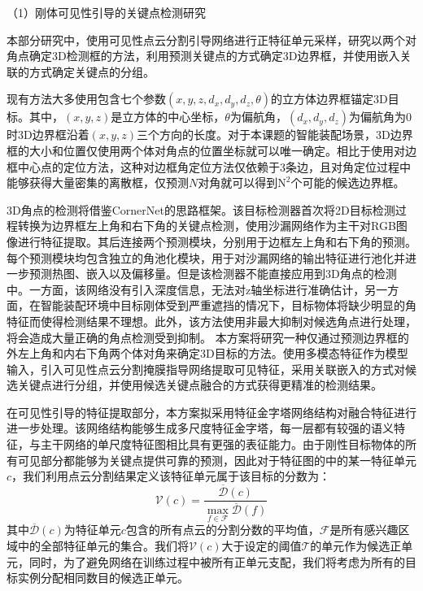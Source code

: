 \documentclass[12pt]{article}
\begin{document}
（1）刚体可见性引导的关键点检测研究

本部分研究中，使用可见性点云分割引导网络进行正特征单元采样，研究以两个对角点确定3D检测框的方法，利用预测关键点的方式确定3D边界框，并使用嵌入关联的方式确定关键点的分组。

现有方法大多使用包含七个参数$(x, y, z, d_x, d_y, d_z, \theta)$的立方体边界框锚定3D目标。其中，$(x,y,z)$是立方体的中心坐标，$\theta$为偏航角，$(d_x, d_y, d_z)$为偏航角为0时3D边界框沿着$(x,y,z)$三个方向的长度。对于本课题的智能装配场景，3D边界框的大小和位置仅使用两个体对角点的位置坐标就可以唯一确定。相比于使用对边框中心点的定位方法，这种对边框角定位方法仅依赖于3条边，且对角定位过程中能够获得大量密集的离散框，仅预测$N$对角就可以得到$\mathrm{N}^2$个可能的候选边界框。


3D角点的检测将借鉴CornerNet的思路框架。该目标检测器首次将2D目标检测过程转换为边界框左上角和右下角的关键点检测，使用沙漏网络作为主干对RGB图像进行特征提取。其后连接两个预测模块，分别用于边框左上角和右下角的预测。每个预测模块均包含独立的角池化模块，用于对沙漏网络的输出特征进行池化并进一步预测热图、嵌入以及偏移量。但是该检测器不能直接应用到3D角点的检测中。一方面，该网络没有引入深度信息，无法对z轴坐标进行准确估计，另一方面，在智能装配环境中目标刚体受到严重遮挡的情况下，目标物体将缺少明显的角特征而使得检测结果不理想。此外，该方法使用非最大抑制对候选角点进行处理，将会造成大量正确的角点检测受到抑制。
本方案将研究一种仅通过预测边界框的外左上角和内右下角两个体对角来确定3D目标的方法。使用多模态特征作为模型输入，引入可见性点云分割掩膜指导网络提取可见特征，采用关联嵌入的方式对候选关键点进行分组，并使用候选关键点融合的方式获得更精准的检测结果。


在可见性引导的特征提取部分，本方案拟采用特征金字塔网络结构对融合特征进行进一步处理。该网络结构能够生成多尺度特征金字塔，每一层都有较强的语义特征，与主干网络的单尺度特征图相比具有更强的表征能力。由于刚性目标物体的所有可见部分都能够为关键点提供可靠的预测，因此对于特征图的中的某一特征单元$c$，我们利用点云分割结果定义该特征单元属于该目标的分数为：
\begin{equation}
\mathcal{V}(c)=\frac{\overline{\mathcal{D}}(c)}{\max _{f \in \mathcal{F}} \overline{\mathcal{D}}(f)}
\label{eq:feature_score}
\end{equation}
其中$\overline{\mathcal{D}}(c)$为特征单元$c$包含的所有点云的分割分数的平均值，$\mathcal{F}$是所有感兴趣区域中的全部特征单元的集合。我们将$\mathcal{V}(c)$大于设定的阈值$\mathcal{T}$的单元作为候选正单元，同时，为了避免网络在训练过程中被所有正单元支配，我们将考虑为所有的目标实例分配相同数目的候选正单元。
\end{document}
